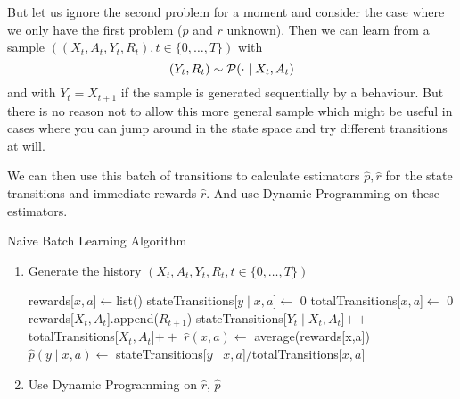 But let us ignore the second problem for a moment and consider the case where we only have the first problem (\(p\) and \(r\) unknown). Then we can learn from a sample \(((X_t, A_t, Y_t, R_t), t\in\{0,\dots, T\})\) with
\[
	(Y_t,R_t)\sim \mathcal{P}(\cdot \mid X_t, A_t)
\]
and with \(Y_t=X_{t+1}\) if the sample is generated sequentially by a behaviour. But there is no reason not to allow this more general sample which might be useful in cases where you can jump around in the state space and try different transitions at will. 

We can then use this batch of transitions to calculate estimators \(\hat{p},\hat{r}\) for the state transitions and immediate rewards \(\hat{r}\). And use Dynamic Programming on these estimators.


\begin{algorithm}
	\caption{Naive Batch Learning Algorithm} \label{naive batch learning algorithm}
	\begin{enumerate}
		\item Generate the history \((X_t, A_t, Y_t, R_t, t\in\{0,\dots, T\})\)
		\begin{algorithmic}[1] 
			 
				\State rewards[\(x,a\)]\(\gets\)list() 
				\State stateTransitions[\(y\mid x,a\)]\(\gets\) 0
				\State totalTransitions[\(x,a\)]\(\gets\) 0
			\EndFor
				\State rewards[\(X_t,A_t\)].append(\(R_{t+1}\))
				\State stateTransitions[\(Y_t\mid X_t,A_t\)]\(++\) \label{algo1: incr 1}
				\State totalTransitions[\(X_t,A_t\)]\(++\)\label{algo1: incr 2}
			\EndFor
				\State \(\hat{r}(x,a) \gets\) average(rewards[x,a])
					\State \(\hat{p}(y\mid x,a)\gets\) stateTransitions[\(y\mid x,a\)]\(/\)totalTransitions[\(x,a\)]\label{calculation of hat p}
				\EndFor
			\EndFor
		\end{algorithmic}
		\item Use Dynamic Programming on \(\hat{r}\), \(\hat{p}\) 
	\end{enumerate}
\end{algorithm}

